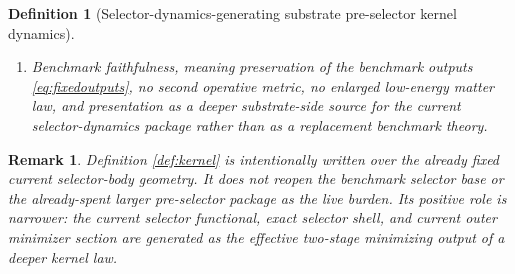 \documentclass[11pt]{article}
\newcommand{\YoctoSelectorBody}[1]{\mathcal B_{#1}^{\mathrm{yoc,sel}}}
\newcommand{\YoctoSelectorShell}[1]{\mathcal Z_{#1}^{\mathrm{yoc,sel}}}
\newcommand{\PreSectionSelectorBody}[1]{\mathcal B_{#1}^{\mathrm{presel,sel}}}
\newcommand{\PreSectionSelectorProj}[1]{\Pi_{#1}^{\mathrm{presel,sel}}}
\newcommand{\PreSectionSelectorFiber}[2]{\mathcal G_{#1}^{\mathrm{presel,sel}}(#2)}
\newcommand{\KernelBody}[1]{\mathcal K_{#1}^{\mathrm{presel,ker}}}
\newcommand{\KernelProj}[1]{\Lambda_{#1}^{\mathrm{presel,ker}}}
\newcommand{\KernelFunctional}[1]{\mathscr R_{#1}^{\mathrm{presel,ker}}}
\newcommand{\KernelComposedFiber}[2]{\mathcal M_{#1}^{\mathrm{presel,ker}}(#2)}
\newcommand{\KernelComposedMin}[1]{\mathfrak m_{#1}^{\mathrm{presel,ker}}}
\newcommand{\KernelShell}[1]{\mathcal Y_{#1}^{\mathrm{presel,ker}}}
\newcommand{\InducedSelectorFunctional}[1]{\widetilde{\mathscr Q}_{#1}^{\mathrm{presel,sel}}}
\newcommand{\InducedSelectorShell}[1]{\widetilde{\mathcal Z}_{#1}^{\mathrm{presel,sel}}}
\newtheorem{definition}{Definition}
\newtheorem{remark}{Remark}
\begin{document}
\begin{definition}[Selector-dynamics-generating substrate pre-selector kernel dynamics]
\begin{enumerate}
    \[
    \KernelComposedFiber{\sigma}{y}
    \equiv
    \left\{
    w\in\KernelBody{\sigma}:
    \PreSectionSelectorProj{\sigma}\bigl(\KernelProj{\sigma}(w)\bigr)=y
    \right\}.
    \]
    The restriction of \(\KernelFunctional{\sigma}\) to \(\KernelComposedFiber{\sigma}{y}\) is required to attain a unique minimizer depending smoothly on \(y\); write it as
    \[
    \KernelComposedMin{\sigma}:\YoctoSelectorBody{\sigma}\to\KernelBody{\sigma}.
    \]
    Define the induced exact selector shell
    \[
    \InducedSelectorShell{\sigma}
    \equiv
    \left\{
    u\in\PreSectionSelectorBody{\sigma}:
    \PreSectionSelectorProj{\sigma}(u)\in\YoctoSelectorShell{\sigma},
    \;
    \InducedSelectorFunctional{\sigma}(u)
    =
    \min_{v\in\PreSectionSelectorFiber{\sigma}{\PreSectionSelectorProj{\sigma}(u)}}
    \InducedSelectorFunctional{\sigma}(v)
    \right\}.
    \]
    The exact kernel shell
    \[
    \KernelShell{\sigma}
    \equiv
    \left\{
    w\in\KernelBody{\sigma}:
    \PreSectionSelectorProj{\sigma}\bigl(\KernelProj{\sigma}(w)\bigr)\in\YoctoSelectorShell{\sigma},
    \;
    \KernelFunctional{\sigma}(w)
    =
    \min_{z\in\KernelComposedFiber{\sigma}{\PreSectionSelectorProj{\sigma}(\KernelProj{\sigma}(w))}}
    \KernelFunctional{\sigma}(z)
    \right\}
    \]
    is required to be a closed embedded submanifold, and
    \[
    \KernelProj{\sigma}\big|_{\KernelShell{\sigma}}
    :
    \KernelShell{\sigma}\xrightarrow{\cong}\InducedSelectorShell{\sigma}
    \]
    is required to be a diffeomorphism.
    \item Benchmark faithfulness, meaning preservation of the benchmark outputs \eqref{eq:fixedoutputs}, no second operative metric, no enlarged low-energy matter law, and presentation as a deeper substrate-side source for the current selector-dynamics package rather than as a replacement benchmark theory.
\end{enumerate}
\end{definition}

\begin{remark}
Definition \ref{def:kernel} is intentionally written over the already fixed current selector-body geometry. It does not reopen the benchmark selector base or the already-spent larger pre-selector package as the live burden. Its positive role is narrower: the current selector functional, exact selector shell, and current outer minimizer section are generated as the effective two-stage minimizing output of a deeper kernel law.
\end{remark}
\end{document}
